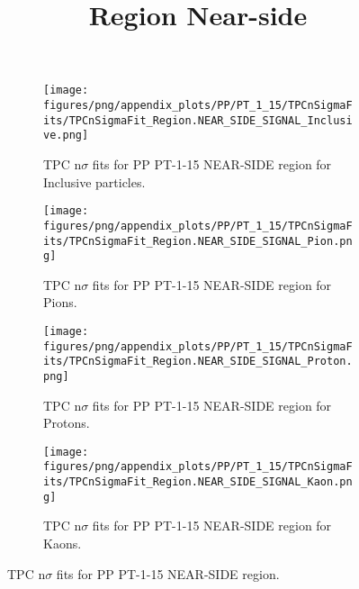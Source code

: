             \begin{figure}[H]
                \title{Region Near-side}
                \begin{subfigure}[b]{0.5\textwidth}
                    \centering
                    \texttt{[image: figures/png/appendix\_plots/PP/PT\_1\_15/TPCnSigmaFits/TPCnSigmaFit\_Region.NEAR\_SIDE\_SIGNAL\_Inclusive.png]}
                    \caption{TPC n$\sigma$ fits for PP PT-1-15 NEAR-SIDE region for Inclusive particles.}
                    \label{fig:appendix_PP_PT-1-15_NEAR_SIDE_SIGNAL_Inclusive}
                \end{subfigure}
                \begin{subfigure}[b]{0.5\textwidth}
                    \centering
                    \texttt{[image: figures/png/appendix\_plots/PP/PT\_1\_15/TPCnSigmaFits/TPCnSigmaFit\_Region.NEAR\_SIDE\_SIGNAL\_Pion.png]}
                    \caption{TPC n$\sigma$ fits for PP PT-1-15 NEAR-SIDE region for Pions.}
                    \label{fig:appendix_PP_PT-1-15_NEAR_SIDE_SIGNAL_Pion}
                \end{subfigure}
                \begin{subfigure}[b]{0.5\textwidth}
                    \centering
                    \texttt{[image: figures/png/appendix\_plots/PP/PT\_1\_15/TPCnSigmaFits/TPCnSigmaFit\_Region.NEAR\_SIDE\_SIGNAL\_Proton.png]}
                    \caption{TPC n$\sigma$ fits for PP PT-1-15 NEAR-SIDE region for Protons.}
                    \label{fig:appendix_PP_PT-1-15_NEAR_SIDE_SIGNAL_Proton}
                \end{subfigure}
                \begin{subfigure}[b]{0.5\textwidth}
                    \centering
                    \texttt{[image: figures/png/appendix\_plots/PP/PT\_1\_15/TPCnSigmaFits/TPCnSigmaFit\_Region.NEAR\_SIDE\_SIGNAL\_Kaon.png]}
                    \caption{TPC n$\sigma$ fits for PP PT-1-15 NEAR-SIDE region for Kaons.}
                    \label{fig:appendix_PP_PT-1-15_NEAR_SIDE_SIGNAL_Kaon}
                \end{subfigure}
                \caption{TPC n$\sigma$ fits for PP PT-1-15 NEAR-SIDE region.}
                \label{fig:appendix_PP_PT-1-15_NEAR_SIDE_SIGNAL}
            \end{figure}
